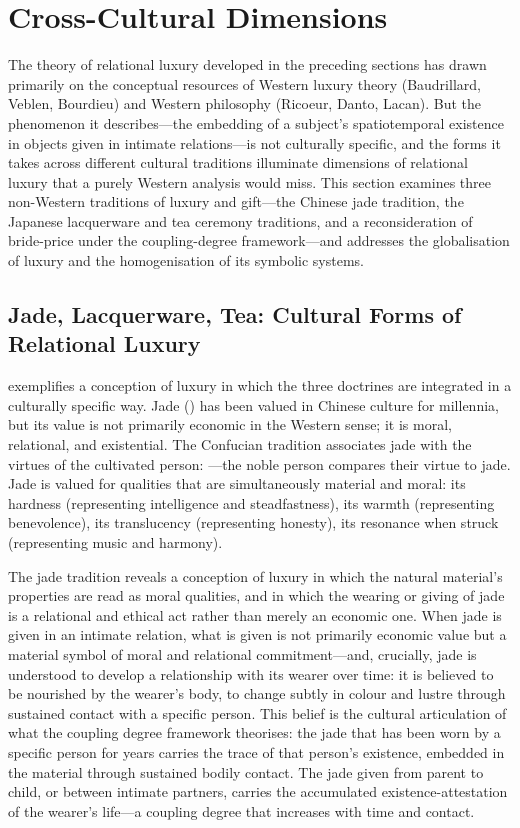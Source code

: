 \section{Cross-Cultural Dimensions}
\label{p16:sec:crosscultural}

\noindent
The theory of relational luxury developed in the preceding sections has drawn primarily on the conceptual resources of Western luxury theory (Baudrillard, Veblen, Bourdieu) and Western philosophy (Ricoeur, Danto, Lacan). But the phenomenon it describes---the embedding of a subject's spatiotemporal existence in objects given in intimate relations---is not culturally specific, and the forms it takes across different cultural traditions illuminate dimensions of relational luxury that a purely Western analysis would miss. This section examines three non-Western traditions of luxury and gift---the Chinese jade tradition, the Japanese lacquerware and tea ceremony traditions, and a reconsideration of bride-price under the coupling-degree framework---and addresses the globalisation of luxury and the homogenisation of its symbolic systems.

\subsection{Jade, Lacquerware, Tea: Cultural Forms of Relational Luxury}
\label{p16:subsec:cultural_forms}

\noindent
{} exemplifies a conception of luxury in which the three doctrines are integrated in a culturally specific way. Jade () has been valued in Chinese culture for millennia, but its value is not primarily economic in the Western sense; it is moral, relational, and existential. The Confucian tradition associates jade with the virtues of the cultivated person: ---the noble person compares their virtue to jade. Jade is valued for qualities that are simultaneously material and moral: its hardness (representing intelligence and steadfastness), its warmth (representing benevolence), its translucency (representing honesty), its resonance when struck (representing music and harmony).

The jade tradition reveals a conception of luxury in which the natural material's properties are read as moral qualities, and in which the wearing or giving of jade is a relational and ethical act rather than merely an economic one. When jade is given in an intimate relation, what is given is not primarily economic value but a material symbol of moral and relational commitment---and, crucially, jade is understood to develop a relationship with its wearer over time: it is believed to be nourished by the wearer's body, to change subtly in colour and lustre through sustained contact with a specific person. This belief is the cultural articulation of what the coupling degree framework theorises: the jade that has been worn by a specific person for years carries the trace of that person's existence, embedded in the material through sustained bodily contact. The jade given from parent to child, or between intimate partners, carries the accumulated existence-attestation of the wearer's life---a coupling degree that increases with time and contact.

